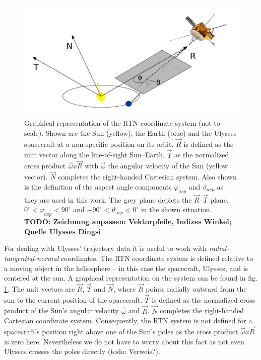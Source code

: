 \begin{figure}[h]
	\includegraphics[width=1\textwidth]{Figures/RTN_AA_angles.pdf}
	\centering
	\caption{Graphical representation of the RTN coordinate system (not to scale). Shown are the Sun (yellow), the Earth (blue) and the Ulysses spacecraft at a non-specific position on its orbit. $\vec{R}$ is defined as the unit vector along the line-of-sight Sun--Earth, $\vec{T}$ as the normalized cross product $\vec{\omega} x \vec{R}$ with $\vec{\omega}$ the angular velocity of the Sun (yellow vector). $\vec{N}$ completes the right-handed Cartesian system. Also shown is the definition of the aspect angle components $\varphi_{asp}$ and $\vartheta_{asp}$ as they are used in this work. The grey plane depicts the $\vec{R}$--$\vec{T}$ plane. $0 ^\circ < \varphi_{asp} < 90^\circ$ and $-90 ^\circ < \vartheta_{asp} < 0^\circ$ in the shown situation. \textbf{TODO: Zeichnung anpassen: Vektorpfeile, Indizes Winkel; Quelle Ulysses Dingsi}}
	\label{fig:rtn}
\end{figure}


For dealing with Ulysses' trajectory data it is useful to work with \textit{radial-tangential-normal} coordinates. The RTN coordinate system is defined relative to a moving object in the heliosphere -- in this case the spacecraft, Ulysses, and is centered at the sun. A graphical representation on the system can be found in fig. \ref{fig:rtn}. The unit vectors are $\vec{R}$, $\vec{T}$ and $\vec{N}$, where $\vec{R}$ points radially outward from the sun to the current position of the spacecraft. $\vec{T}$ is defined as the normalized cross product of the Sun's angular velocity $\vec{\omega}$ and $\vec{R}$. $\vec{N}$ completes the right-handed Cartesian coordinate system. Consequently, the RTN system is not defined for a spacecraft's position right above one of the Sun's poles as the cross product $\vec{\omega} x \vec{R}$ is zero here. Nevertheless we do not have to worry about this fact as not even Ulysses crosses the poles directly (todo: Verweis?).




